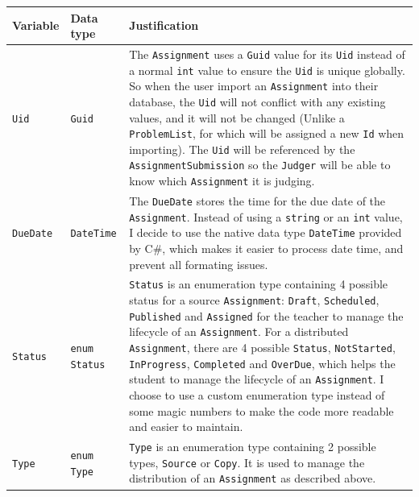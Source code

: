 \documentclass[a4paper]{report}
\begin{document}
\begin{tabulary}{\textwidth}{|l|l|L|}
    \hline
    Variable & Data type & Justification \\
    \hline
    \texttt{Uid} & \texttt{Guid} & The \texttt{Assignment} uses a \texttt{Guid} value for its \texttt{Uid} instead of a normal \texttt{int} value to ensure the \texttt{Uid} is unique globally. So when the user import an \texttt{Assignment} into their database, the \texttt{Uid} will not conflict with any existing values, and it will not be changed (Unlike a \texttt{ProblemList}, for which will be assigned a new \texttt{Id} when importing). The \texttt{Uid} will be referenced by the \texttt{AssignmentSubmission} so the \texttt{Judger} will be able to know which \texttt{Assignment} it is judging. \\
    \hline
    \texttt{DueDate} & \texttt{DateTime} & The \texttt{DueDate} stores the time for the due date of the \texttt{Assignment}. Instead of using a \texttt{string} or an \texttt{int} value, I decide to use the native data type \texttt{DateTime} provided by C\#, which makes it easier to process date time, and prevent all formating issues. \\
    \hline
    \texttt{Status} & \texttt{enum Status} & \texttt{Status} is an enumeration type containing 4 possible status for a source \texttt{Assignment}: \texttt{Draft}, \texttt{Scheduled}, \texttt{Published} and \texttt{Assigned} for the teacher to manage the lifecycle of an \texttt{Assignment}. For a distributed \texttt{Assignment}, there are 4 possible \texttt{Status}, \texttt{NotStarted}, \texttt{InProgress}, \texttt{Completed} and \texttt{OverDue}, which helps the student to manage the lifecycle of an \texttt{Assignment}. I choose to use a custom enumeration type instead of some magic numbers to make the code more readable and easier to maintain.\\
    \hline
    \texttt{Type} & \texttt{enum Type} & \texttt{Type} is an enumeration type containing 2 possible types, \texttt{Source} or \texttt{Copy}. It is used to manage the distribution of an \texttt{Assignment} as described above. \\
    \hline
\end{tabulary}
\end{document}
